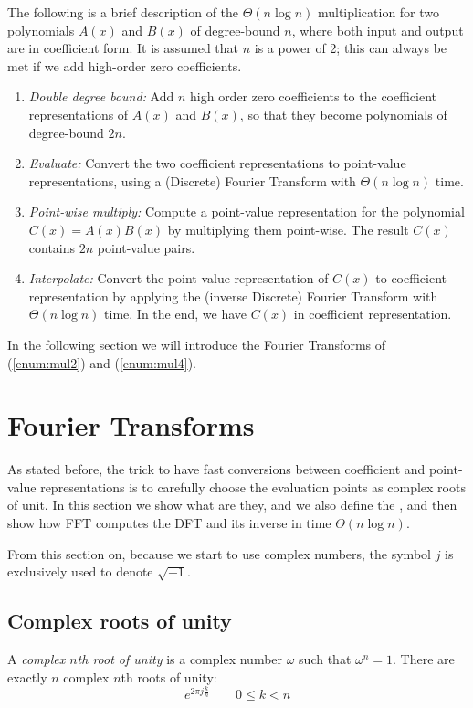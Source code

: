 The following is a brief description of the $\Theta(n \log{n})$ multiplication
for two polynomials $A(x)$ and $B(x)$ of degree-bound $n$, where both input and
output are in coefficient form. It is assumed that $n$ is a power of 2; this
can always be met if we add high-order zero coefficients.
\begin{enumerate}
  \item \label{enum:mul1} \emph{Double degree bound:} Add $n$ high order zero
    coefficients to the coefficient representations of $A(x)$ and $B(x)$, so
    that they become polynomials of degree-bound $2n$.
  \item \label{enum:mul2} \emph{Evaluate:} Convert the two coefficient
    representations to point-value representations, using a (Discrete) Fourier
    Transform with $\Theta(n \log{n})$ time.
  \item \label{enum:mul3} \emph{Point-wise multiply:} Compute a point-value
    representation for the polynomial $C(x) = A(x) B(x)$ by multiplying them
    point-wise. The result $C(x)$ contains $2n$ point-value pairs.
  \item \label{enum:mul4} \emph{Interpolate:} Convert the point-value
    representation of $C(x)$ to coefficient representation by applying the
    (inverse Discrete) Fourier Transform with $\Theta(n \log{n})$ time. In the
    end, we have $C(x)$ in coefficient representation.
\end{enumerate}

In the following section we will introduce the Fourier Transforms of
(\ref{enum:mul2}) and (\ref{enum:mul4}).

\section{Fourier Transforms}\label{sec:fft}
As stated before, the trick to have fast conversions between coefficient and
point-value representations is to carefully choose the evaluation points as
complex roots of unit. In this section we show what are they, and we also
define the , and then show how FFT
computes the DFT and its inverse in time $\Theta(n \log{n})$.

From this section on, because we start to use complex numbers, the symbol $j$
is exclusively used to denote $\sqrt{-1}$.

\subsection{Complex roots of unity}
A \emph{complex $n$th root of unity} is a complex number $\omega$ such that
$\omega^n = 1$. There are exactly $n$ complex $n$th roots of unity:
\begin{equation}
  e^{2 \pi j \frac{k}{n}} \qquad 0 \leq k < n
  \label{eq:all-roots}
\end{equation}

